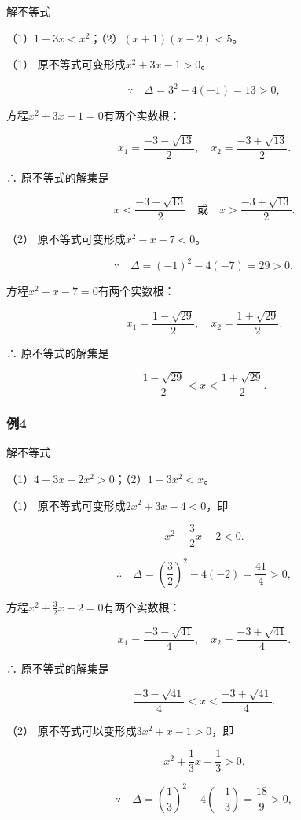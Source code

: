解不等式

（1）\(1 - 3x < x^2\)；（2）\((x + 1)(x - 2) < 5\)。

 （1） 原不等式可变形成\(x^{2} + 3x - 1 > 0\)。

\[
\because \quad \Delta = 3^{2} - 4 (- 1) = 13 > 0,
\]

方程\(x^{2} + 3x - 1 = 0\)有两个实数根：

\[
x_{1} = \frac{- 3 - \sqrt{13}}{2}, \quad x_{2} = \frac{- 3 + \sqrt{13}}{2}.
\]

∴ 原不等式的解集是

\[
x < \frac{- 3 - \sqrt{13}}{2} \quad \text{或} \quad x > \frac{- 3 + \sqrt{13}}{2}.
\]

（2） 原不等式可变形成\(x^{2} - x - 7 < 0\)。

\[
\because \quad \Delta = (- 1)^{2} - 4 (- 7) = 29 > 0,
\]

方程\(x^{2}-x-7=0\)有两个实数根：

\[
x_{1} = \frac{1 - \sqrt{29}}{2}, \quad x_{2} = \frac{1 + \sqrt{29}}{2}.
\]

∴ 原不等式的解集是

\[
\frac{1 - \sqrt{29}}{2} < x < \frac{1 + \sqrt{29}}{2}.
\]

\subsubsection{例4}

解不等式

（1）\(4-3x-2x^{2}>0\)；（2）\(1 - 3x^{2} < x\)。

 （1） 原不等式可变形成\(2x^{2} + 3x - 4 < 0\)，即

\[
x^{2} + \frac{3}{2} x - 2 < 0.
\]

\[
\therefore \quad \Delta = \left(\frac{3}{2}\right)^{2} - 4 (- 2) = \frac{41}{4} > 0,
\]

方程\(x^{2} + \frac{3}{2} x - 2 = 0\)有两个实数根：

\[
x_{1} = \frac{- 3 - \sqrt{41}}{4}, \quad x_{2} = \frac{- 3 + \sqrt{41}}{4}.
\]

∴ 原不等式的解集是

\[
\frac{- 3 - \sqrt{41}}{4} < x < \frac{- 3 + \sqrt{41}}{4}.
\]

（2） 原不等式可以变形成\(3x^{2}+x-1>0\)，即

\[
x^{2}+\frac{1}{3}x-\frac{1}{3} > 0.
\]

\[
\because \quad \Delta = \left(\frac{1}{3}\right)^{2} - 4 \left(- \frac{1}{3}\right) = \frac{18}{9} > 0,
\]

